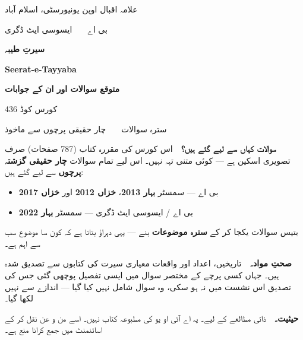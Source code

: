 \thispagestyle{empty}


\vspace*{0.9cm}
{\color{bmink}
  {\large علامہ اقبال اوپن یونیورسٹی، اسلام آباد}\par
  \vspace{3pt}
  {بی اے \ \textbullet\ \ ایسوسی ایٹ ڈگری}\par
  \vspace{20pt}
  {\Huge\bfseries\color{bmblue} سیرتِ طیبہ}\par
  \vspace{6pt}
  {\large\bfseries \textenglish{Seerat-e-Tayyaba}}\par
  \vspace{12pt}
  {\LARGE\bfseries متوقع سوالات اور ان کے جوابات}\par
  \vspace{12pt}
  {\large کورس کوڈ \textenglish{436}}\par
  \vspace{4pt}
  {سترہ سوالات \ \textbullet\ \ چار حقیقی پرچوں سے ماخوذ\par}
}

\vspace{1.0cm}

\begin{tcolorbox}[enhanced, colback=white, colframe=bmblue, boxrule=0.6pt,
                  arc=3pt, left=12pt, right=12pt, top=10pt, bottom=10pt]
\textbf{\color{bmblue}سوالات کہاں سے لیے گئے ہیں؟}\ \
اس کورس کی مقررہ کتاب (\textenglish{787} صفحات) صرف تصویری اسکین ہے --- کوئی
متنی تہہ نہیں۔ اس لیے تمام سوالات \textbf{چار حقیقی گزشتہ پرچوں} سے لیے گئے
ہیں:

\smallskip
\begin{itemize}\setlength{\itemsep}{0pt}\setlength{\topsep}{2pt}
  \item بی اے --- سمسٹر \textbf{بہار \textenglish{2013}}، \textbf{خزاں
        \textenglish{2012}} اور \textbf{خزاں \textenglish{2017}}
  \item بی اے / ایسوسی ایٹ ڈگری --- سمسٹر \textbf{بہار \textenglish{2022}}
\end{itemize}

\smallskip
بتیس سوالات یکجا کر کے \textbf{سترہ موضوعات} بنے --- یہی دہراؤ بتاتا ہے کہ
کون سا موضوع سب سے اہم ہے۔

\medskip
\textbf{\color{bmblue}صحتِ مواد۔}\ \
تاریخیں، اعداد اور واقعات معیاری سیرت کی کتابوں سے تصدیق شدہ ہیں۔ جہاں کسی
پرچے کے مختصر سوال میں ایسی تفصیل پوچھی گئی جس کی تصدیق اس نشست میں نہ ہو
سکی، وہ سوال شامل نہیں کیا گیا --- اندازے سے نہیں لکھا گیا۔

\medskip
\textbf{\color{bmblue}حیثیت۔}\ \
ذاتی مطالعے کے لیے۔ یہ اے آئی او یو کی مطبوعہ کتاب نہیں۔ اسے من و عن نقل کر کے
اسائنمنٹ میں جمع کرانا منع ہے۔
\end{tcolorbox}

